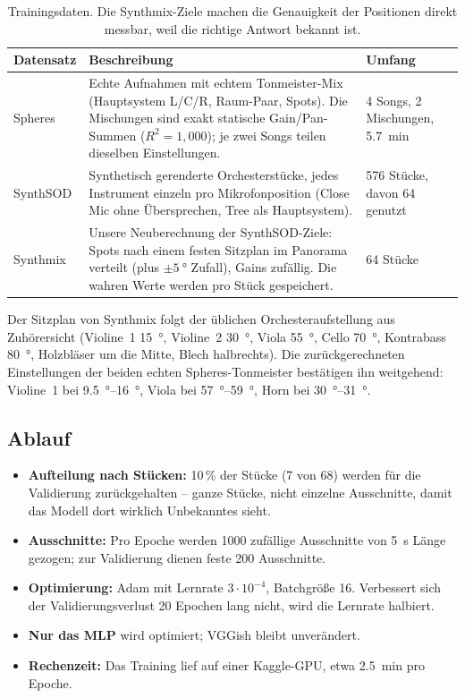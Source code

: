 \documentclass[11pt,a4paper]{article}
\begin{document}
\begin{table}[h]
\centering\small
\begin{tabularx}{\linewidth}{@{}lXl@{}}
\toprule
Datensatz & Beschreibung & Umfang \\
\midrule
Spheres & Echte Aufnahmen mit echtem Tonmeister-Mix (Hauptsystem L/C/R, Raum-Paar, Spots). Die Mischungen sind exakt statische Gain/Pan-Summen ($R^2=1{,}000$); je zwei Songs teilen dieselben Einstellungen. & 4 Songs, 2 Mischungen, \SI{5.7}{min} \\
SynthSOD & Synthetisch gerenderte Orchesterstücke, jedes Instrument einzeln pro Mikrofonposition (Close Mic ohne Übersprechen, Tree als Hauptsystem). & 576 Stücke, davon 64 genutzt \\
Synthmix & Unsere Neuberechnung der SynthSOD-Ziele: Spots nach einem festen Sitzplan im Panorama verteilt (plus $\pm\SI{5}{\degree}$ Zufall), Gains zufällig. Die wahren Werte werden pro Stück gespeichert. & 64 Stücke \\
\bottomrule
\end{tabularx}
\caption{Trainingsdaten. Die Synthmix-Ziele machen die Genauigkeit der
Positionen direkt messbar, weil die richtige Antwort bekannt ist.}
\end{table}

Der Sitzplan von Synthmix folgt der üblichen Orchesteraufstellung aus
Zuhörersicht (Violine~1 \SI{15}{\degree}, Violine~2 \SI{30}{\degree},
Viola \SI{55}{\degree}, Cello \SI{70}{\degree}, Kontrabass \SI{80}{\degree},
Holzbläser um die Mitte, Blech halbrechts). Die zurückgerechneten Einstellungen
der beiden echten Spheres-Tonmeister bestätigen ihn weitgehend: Violine~1 bei
\SIrange{9.5}{16}{\degree}, Viola bei \SIrange{57}{59}{\degree}, Horn bei
\SIrange{30}{31}{\degree}.

\subsection{Ablauf}
\begin{itemize}[nosep]
  \item \textbf{Aufteilung nach Stücken:} 10\,\% der Stücke (7 von 68) werden
    für die Validierung zurückgehalten -- ganze Stücke, nicht einzelne
    Ausschnitte, damit das Modell dort wirklich Unbekanntes sieht.
  \item \textbf{Ausschnitte:} Pro Epoche werden \num{1000} zufällige
    Ausschnitte von \SI{5}{s} Länge gezogen; zur Validierung dienen feste 200
    Ausschnitte.
  \item \textbf{Optimierung:} Adam \cite{kingma2015} mit Lernrate
    $3\cdot10^{-4}$, Batchgröße 16. Verbessert sich der Validierungsverlust
    20 Epochen lang nicht, wird die Lernrate halbiert.
  \item \textbf{Nur das MLP} wird optimiert; VGGish bleibt unverändert.
  \item \textbf{Rechenzeit:} Das Training lief auf einer Kaggle-GPU,
    etwa \SI{2.5}{min} pro Epoche.
\end{itemize}
\end{document}
